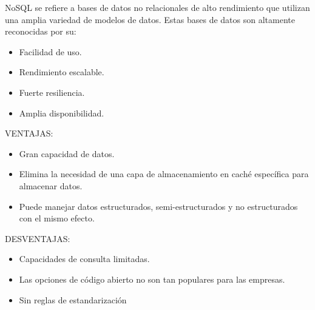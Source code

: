 \documentclass{article}
\begin{document}
NoSQL se refiere a bases de datos no relacionales de alto rendimiento que utilizan una amplia variedad de modelos de datos. Estas bases de datos son altamente reconocidas por su: 
\begin{itemize}
    \item Facilidad de uso. 
    \item Rendimiento escalable.
    \item Fuerte resiliencia. 
    \item Amplia disponibilidad. 
\end{itemize}
VENTAJAS:
\begin{itemize}
    \item Gran capacidad de datos.
    \item Elimina la necesidad de una capa de almacenamiento en caché específica para almacenar datos.
    \item Puede manejar datos estructurados, semi-estructurados y no estructurados con el mismo efecto. 
\end{itemize}
DESVENTAJAS:
\begin{itemize}
    \item Capacidades de consulta limitadas.
    \item Las opciones de código abierto no son tan populares para las empresas. 
    \item Sin reglas de estandarización 
\end{itemize}
\end{document}
